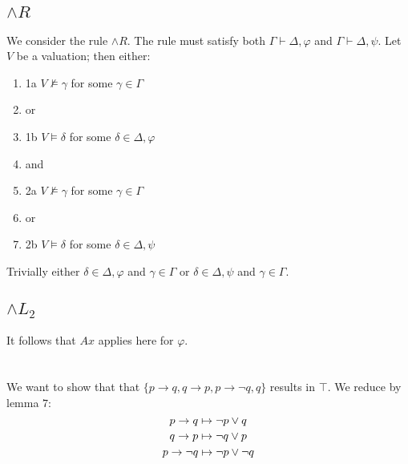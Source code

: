\documentclass{article}
\newcommand\mymapsto{\mathrel{\ooalign{$\rightarrow$\cr%
    \kern-.15ex\raise.275ex\hbox{\scalebox{1}[0.522]{$\mid$}}\cr}}}
\begin{document}
    \newpage
    \section{}
    \subsection{$\land R$}
    We consider the rule $\land R$.
    The rule must satisfy both $\Gamma \vdash \Delta, \varphi$ and $\Gamma \vdash \Delta, \psi$.
    Let $V$ be a valuation; then either:
    \begin{enumerate}
        \item 1a $V \not\models \gamma$ for some $\gamma \in \Gamma$
        \item or
        \item 1b $V \models \delta$ for some $\delta \in \Delta, \varphi$
        \item and
        \item 2a $V \not\models \gamma$ for some $\gamma \in \Gamma$
        \item or
        \item 2b $V \models \delta$ for some $\delta \in \Delta, \psi$
    \end{enumerate}
    Trivially either $\delta \in \Delta, \varphi$ and $\gamma \in \Gamma$ or $\delta \in \Delta, \psi$ and $\gamma \in \Gamma$.
    \subsection{$\land L_2$}
    It follows that $Ax$ applies here for $\varphi$.

    \section{}
    We want to show that that $\{p \rightarrow q, q \rightarrow p, p \rightarrow \neg q, q\}$ results in $\top$.
    We reduce by lemma $7$:
    $$p \rightarrow q \mymapsto \neg p \lor q$$
    $$q \rightarrow p \mymapsto \neg q \lor p$$
    $$p \rightarrow \neg q \mymapsto \neg p \lor \neg q$$

\end{document}
